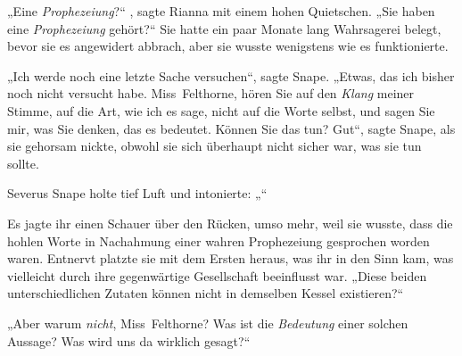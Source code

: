 „Eine \emph{Prophezeiung}?“ , sagte Rianna mit einem hohen Quietschen. „Sie haben eine \emph{Prophezeiung} gehört?“ Sie hatte ein paar Monate lang Wahrsagerei belegt, bevor sie es angewidert abbrach, aber sie wusste wenigstens wie es funktionierte.

„Ich werde noch eine letzte Sache versuchen“, sagte Snape. „Etwas, das ich bisher noch nicht versucht habe. Miss~Felthorne, hören Sie auf den \emph{Klang} meiner Stimme, auf die Art, wie ich es sage, nicht auf die Worte selbst, und sagen Sie mir, was Sie denken, das es bedeutet. Können Sie das tun? Gut“, sagte Snape, als sie gehorsam nickte, obwohl sie sich überhaupt nicht sicher war, was sie tun sollte.

Severus Snape holte tief Luft und intonierte: „“

Es jagte ihr einen Schauer über den Rücken, umso mehr, weil sie wusste, dass die hohlen Worte in Nachahmung einer wahren Prophezeiung gesprochen worden waren. Entnervt platzte sie mit dem Ersten heraus, was ihr in den Sinn kam, was vielleicht durch ihre gegenwärtige Gesellschaft beeinflusst war. „Diese beiden unterschiedlichen Zutaten können nicht in demselben Kessel existieren?“

„Aber warum \emph{nicht}, Miss~Felthorne? Was ist die \emph{Bedeutung} einer solchen Aussage? Was wird uns da wirklich gesagt?“


